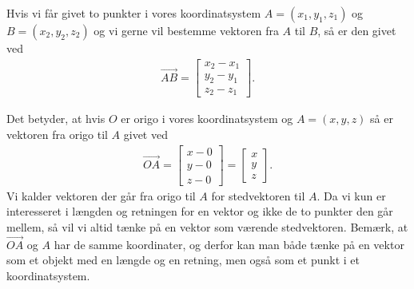 Hvis vi får givet to punkter i vores koordinatsystem $A=(x_1,y_1,z_1)$ og $B=(x_2,y_2,z_2)$ og vi gerne vil bestemme vektoren fra $A$ til $B$, så er den givet ved
\begin{align*}
\overrightarrow{AB}= \begin{bmatrix}
x_2-x_1 \\
y_2 - y_1\\
z_2 - z_1
\end{bmatrix}.
\end{align*}

Det betyder, at hvis $O$ er origo i vores koordinatsystem og $A=(x,y,z)$ så er vektoren fra origo til $A$ givet ved
\begin{align*}
\overrightarrow{OA}= \begin{bmatrix}x-0 \\y - 0 \\ z - 0 \end{bmatrix}= \begin{bmatrix}x \\y \\ z \end{bmatrix}.
\end{align*}
Vi kalder vektoren der går fra origo til $A$ for stedvektoren til $A$. Da vi kun er interesseret i længden og retningen for en vektor og ikke de to punkter den går mellem, så vil vi altid tænke på en vektor som værende stedvektoren. Bemærk, at $\overrightarrow{OA}$ og $A$ har de samme koordinater, og derfor kan man både tænke på en vektor som et objekt med en længde og en retning, men også som et punkt i et koordinatsystem.

